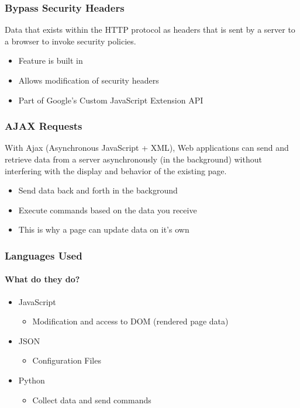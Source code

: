 \documentclass[aspectratio=169]{beamer}
\begin{document}
\begin{frame}
  \frametitle{Bypass Security Headers}
  \begin{center}
      \begin{tcolorbox}[title=Security Header Definition,colback=gray]
        Data that exists within the HTTP protocol as headers that is sent by a server to a browser to invoke security policies.
      \end{tcolorbox}
      \begin{itemize}
      \item Feature is built in
      \item Allows modification of security headers
      \item Part of Google's Custom JavaScript Extension API
      \end{itemize}
  \end{center}
\end{frame}

\begin{frame}
  \frametitle{AJAX Requests}
  \begin{center}
    \begin{tcolorbox}[title=\href{https://en.wikipedia.org/wiki/Ajax_(programming)}{AJAX Definition},colback=gray]
      With Ajax (Asynchronous JavaScript + XML), Web applications can send and retrieve data from a server asynchronously (in the background) without interfering with the display and behavior of the existing page.
    \end{tcolorbox}
    \begin{itemize}
    \item Send data back and forth in the background
    \item Execute commands based on the data you receive
    \item This is why a page can update data on it's own
    \end{itemize}
  \end{center}
\end{frame}

\begin{frame}
  \frametitle{Languages Used}
  \framesubtitle{What do they do?}
  \begin{center}
    \begin{itemize}
    \item JavaScript
      \begin{itemize}
        \item Modification and access to DOM (rendered page data)
      \end{itemize}
    \item JSON
      \begin{itemize}
        \item Configuration Files
      \end{itemize}
    \item Python
      \begin{itemize}
        \item Collect data and send commands
      \end{itemize}
    \end{itemize}
  \end{center}
\end{frame}
\end{document}
